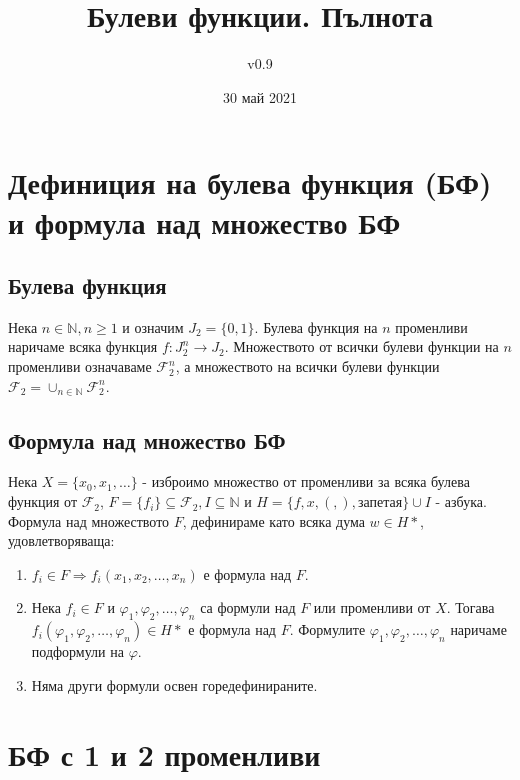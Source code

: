 \documentclass[fleqn,12pt]{article}
\title{Булеви функции. Пълнота}
\author{v0.9}
\date{30 май 2021}
\begin{document}
\maketitle

\tableofcontents

\begin{flushleft}

\section{Дефиниция на булева функция (БФ) и формула над множество БФ}

\subsection{Булева функция}
Нека $n \in \mathbb{N}, n \geq 1$ и означим $J_2 = \{ 0, 1 \}$. 
Булева функция на $n$ променливи наричаме всяка функция $f : J_2^n \rightarrow J_2$.
Множеството от всички булеви функции на $n$ променливи означаваме
$\mathcal{F}_2^n$, а множеството на всички булеви функции $\mathcal{F}_2 = \cup_{n \in \mathbb{N}} \mathcal{F}_2^n$.

\subsection{Формула над множество БФ}
Нека $X = \{ x_0, x_1, \dots \}$ - изброимо множество от променливи за
всяка булева функция от $\mathcal{F}_2$, $F = \{ f_i \} \subseteq \mathcal{F}_2, I \subseteq \mathbb{N}$
и $H = \{ f, x, (, ), \text{запетая}  \} \cup I $ - азбука.
Формула над множеството $F$, дефинираме като всяка дума $w \in H*$, удовлетворяваща:
\begin{enumerate}
    \item $f_i \in F \Rightarrow f_i(x_1,x_2,\dots,x_n)$ е формула над $F$.
    \item \label{formulas:superposition} Нека $f_i \in F$ и $\varphi_1, \varphi_2, \dots, \varphi_n$ са формули над $F$ или променливи от $X$.
    Тогава $f_i(\varphi_1, \varphi_2, \dots, \varphi_n) \in H*$ е формула над $F$. Формулите $\varphi_1, \varphi_2, \dots, \varphi_n$ наричаме подформули на $\varphi$.
    \item Няма други формули освен горедефинираните.
\end{enumerate}

\section{БФ с 1 и 2 променливи}


\end{flushleft}
\end{document}
